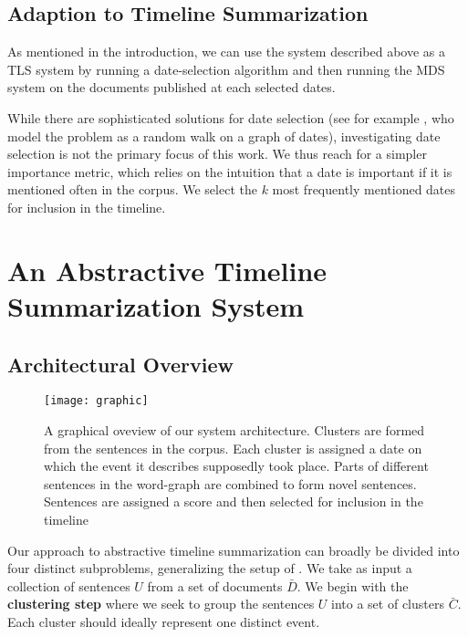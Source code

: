 \documentclass[a4paper,BCOR=10mm]{report}
\numberwithin{lemma}{chapter}
\numberwithin{definition}{chapter}
\begin{document}
\section{Adaption to Timeline Summarization}

As mentioned in the introduction, we can use the system described above as a TLS system by running a date-selection algorithm and then running the MDS system on the documents published at each selected dates.

While there are sophisticated solutions for date selection (see for example \citet{tran-datesel}, who model the problem as a random walk on a graph of dates), investigating date selection is not the primary focus of this work.
We thus reach for a simpler importance metric, which relies on the intuition that a date is important if it is mentioned often in the corpus. We select the $k$ most frequently mentioned dates for inclusion in the timeline.


\chapter{An Abstractive Timeline Summarization System} \label{sec:system}

\section{Architectural Overview}

\begin{figure}
\texttt{[image: graphic]}
\caption{A graphical oveview of our system architecture. Clusters are formed from the sentences in the corpus. Each cluster is assigned a date on which the event it describes supposedly took place. Parts of different sentences in the word-graph are combined to form novel sentences. Sentences are assigned a score and then selected for inclusion in the timeline}
\label{fig:arch-overview}
\end{figure}

Our approach to abstractive timeline summarization can broadly be divided into four distinct subproblems, generalizing the setup of \citet{banerjee}.
We take as input a collection of sentences $U$ from a set of documents $\bar{D}$.
We begin with the \textbf{clustering step} where we seek to group the sentences $U$ into a set of clusters $\bar{C}$. Each cluster should ideally represent one distinct event.
\end{document}
